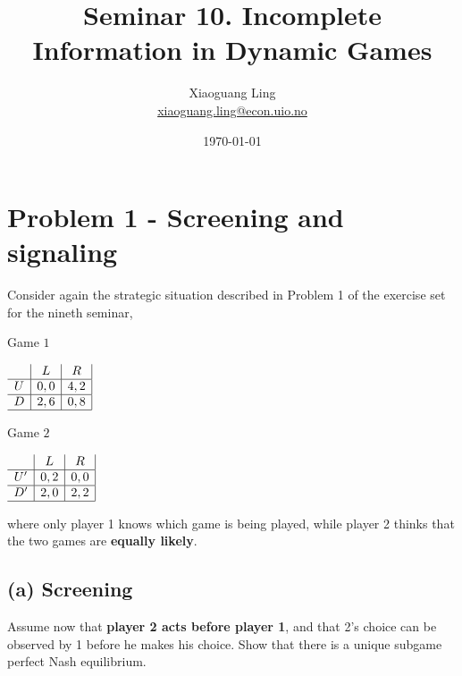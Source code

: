 \documentclass{article}
\title{Seminar 10. Incomplete Information in Dynamic Games}
\author{Xiaoguang Ling \\  \href{xiaoguang.ling@econ.uio.no}{xiaoguang.ling@econ.uio.no}}
\date{\today}
\begin{document}
\maketitle
 
\section{Problem 1 - Screening and signaling}

Consider again the strategic situation described in Problem 1 of the exercise set for the nineth seminar, 

\begin{center}
Game $1$ \vspace{6pt}

$
\begin{array}{c|c|c|}
 & L & R \\
\hline
U & 0,0 & 4,2 \\
\hline
D & 2,6 & 0,8 \\
\hline
\end{array}
$
\end{center}

\begin{center}
Game $2$ \vspace{6pt}

$
\begin{array}{c|c|c|}
 & L & R \\
\hline
U' & 0,2 & 0,0 \\
\hline
D' & 2,0 & 2,2 \\
\hline
\end{array}
$
\end{center}

where only player 1 knows which game is being played, while player 2 thinks that the two games are \textbf{equally likely}.


\subsection*{(a) Screening} Assume now that \textbf{player 2 acts before player 1}, and that 2's choice can be observed by 1 before he makes his choice. Show that there is a unique subgame perfect Nash equilibrium. 
\end{document}
